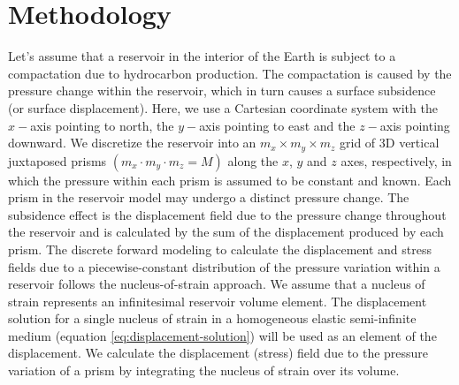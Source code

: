 \documentclass[P]{BrJG_submit}
\begin{document}
\section*{Methodology}
Let's assume that a reservoir in the interior of the Earth is subject to a compactation due to hydrocarbon production. 
The compactation is caused by the pressure change within the reservoir, which in turn causes  a surface subsidence (or surface displacement). 
Here, we use a Cartesian coordinate system with the $x-$axis pointing to north, the $y-$axis pointing to east and the $z-$axis pointing downward.
We discretize the reservoir into an $ m_{x} \times m_{y} \times m_{z} $ grid of 3D vertical juxtaposed prisms $(m_{x} \cdot m_{y} \cdot m_{z} = M)$ along the 
$x$, $y$ and $z$ axes, respectively, in which the pressure within each prism is 
assumed to be constant and known. 
Each prism in the reservoir model may undergo a distinct pressure change.
The subsidence effect is the displacement field due to the pressure change throughout the reservoir and is calculated by the sum of the displacement produced by each prism.
The discrete forward modeling to calculate the displacement and stress fields due to a piecewise-constant distribution of the pressure variation within a reservoir follows the nucleus-of-strain approach. 
We assume that a nucleus of strain represents an infinitesimal reservoir volume 
element. The displacement solution for a single nucleus of strain in a homogeneous elastic semi-infinite medium (equation \ref{eq:displacement-solution}) will be used as an element of the displacement.
We calculate the displacement (stress) field due to the pressure variation of a prism by integrating the nucleus of strain over its volume. 

\end{document}
